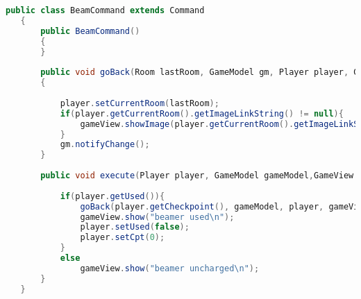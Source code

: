 \documentclass[a4paper , 10pt]{article}
\begin{document}
\begin{lstlisting}[language=Java, caption={Beamcommand}]
   public class BeamCommand extends Command
   {
       public BeamCommand()
       {
       }
   
       public void goBack(Room lastRoom, GameModel gm, Player player, GameView gameView)
       {
   
           player.setCurrentRoom(lastRoom);
           if(player.getCurrentRoom().getImageLinkString() != null){
               gameView.showImage(player.getCurrentRoom().getImageLinkString());
           }
           gm.notifyChange();
       }
   
       public void execute(Player player, GameModel gameModel,GameView gameView){
   
           if(player.getUsed()){
               goBack(player.getCheckpoint(), gameModel, player, gameView);
               gameView.show("beamer used\n");
               player.setUsed(false);
               player.setCpt(0);
           }
           else
               gameView.show("beamer uncharged\n");
       }
   }
\end{lstlisting}
\end{document}

